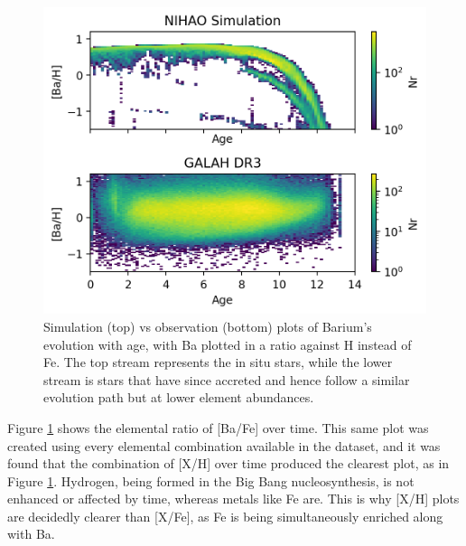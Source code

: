 \documentclass[fleqn,usenatbib]{mnras}
\begin{document}
\begin{figure}
	\includegraphics[width=\columnwidth]{figures/Ba_H_time.png}
    \caption{Simulation (top) vs observation (bottom) plots of Barium's evolution with age, with Ba plotted in a ratio against H instead of Fe. The top stream represents the in situ stars, while the lower stream is stars that have since accreted and hence follow a similar evolution path but at lower element abundances.}
    \label{fig:BaHtime}
\end{figure}


Figure \ref{fig:BaHtime} shows the elemental ratio of [Ba/Fe] over time. This same plot was created using every elemental combination available in the dataset, and it was found that the combination of [X/H] over time produced the clearest plot, as in Figure \ref{fig:BaHtime}. Hydrogen, being formed in the Big Bang nucleosynthesis, is not enhanced or affected by time, whereas metals like Fe are. This is why [X/H] plots are decidedly clearer than [X/Fe], as Fe is being simultaneously enriched along with Ba. 
\end{document}
